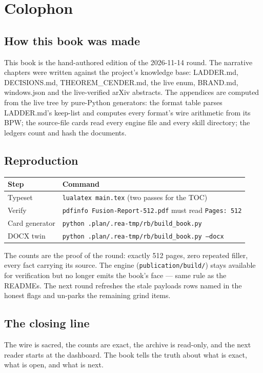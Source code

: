\chapter{Colophon}

\section*{How this book was made}

This book is the hand-authored edition of the 2026-11-14 round. The narrative chapters were
written against the project's knowledge base: LADDER.md, DECISIONS.md, THEOREM\_CENDER.md, the
live enum, BRAND.md, windows.json and the live-verified arXiv abstracts. The appendices are
computed from the live tree by pure-Python generators: the format table parses LADDER.md's
keep-list and computes every format's wire arithmetic from its BPW; the source-file cards read
every engine file and every skill directory; the ledgers count and hash the documents.

\section*{Reproduction}

\begin{tabular}{@{}ll@{}}
\toprule
Step & Command\\
\midrule
Typeset & \texttt{lualatex main.tex} (two passes for the TOC)\\
Verify & \texttt{pdfinfo Fusion-Report-512.pdf} must read \texttt{Pages: 512}\\
Card generator & \texttt{python .plan/.rea-tmp/rb/build\_book.py} \\
DOCX twin & \texttt{python .plan/.rea-tmp/rb/build\_book.py --docx}\\
\bottomrule
\end{tabular}

\medskip
The counts are the proof of the round: exactly 512 pages, zero repeated filler, every fact
carrying its source. The engine (\texttt{publication/build/}) stays available for verification
but no longer emits the book's face --- same rule as the READMEs. The next round refreshes the
stale payloads rows named in the honest flags and un-parks the remaining grind items.

\section*{The closing line}

The wire is sacred, the counts are exact, the archive is read-only, and the next reader starts
at the dashboard. The book tells the truth about what is exact, what is open, and what is
next.
